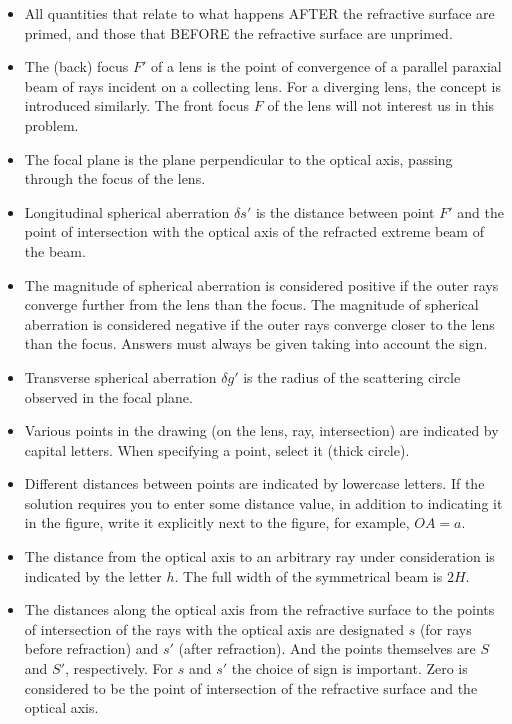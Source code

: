 \documentclass[11pt,a4paper]{article}
\begin{document}
\begin{itemize}
    \item All quantities that relate to what happens AFTER the refractive surface are primed, and those that BEFORE the refractive surface are unprimed.
    \item The (back) focus $F'$ of a lens is the point of convergence of a parallel paraxial beam of rays incident on a collecting lens. For a diverging lens, the concept is introduced similarly. The front focus $F$ of the lens will not interest us in this problem.
    \item The focal plane is the plane perpendicular to the optical axis, passing through the focus of the lens.
    \item Longitudinal spherical aberration $\delta s'$ is the distance between point $F'$ and the point of intersection with the optical axis of the refracted extreme beam of the beam.
    \item The magnitude of spherical aberration is considered positive if the outer rays converge further from the lens than the focus. The magnitude of spherical aberration is considered negative if the outer rays converge closer to the lens than the focus. Answers must always be given taking into account the sign.
    \item Transverse spherical aberration $\delta g'$ is the radius of the scattering circle observed in the focal plane.
    \item Various points in the drawing (on the lens, ray, intersection) are indicated by capital letters. When specifying a point, select it (thick circle).
    \item Different distances between points are indicated by lowercase letters. If the solution requires you to enter some distance value, in addition to indicating it in the figure, write it explicitly next to the figure, for example, $OA = a$.
    \item The distance from the optical axis to an arbitrary ray under consideration is indicated by the letter $h$. The full width of the symmetrical beam is $2H$.
    \item The distances along the optical axis from the refractive surface to the points of intersection of the rays with the optical axis are designated $s$ (for rays before refraction) and $s'$ (after refraction). And the points themselves are $S$ and $S'$, respectively. For $s$ and $s'$ the choice of sign is important. Zero is considered to be the point of intersection of the refractive surface and the optical axis.
\end{itemize}
\end{document}
